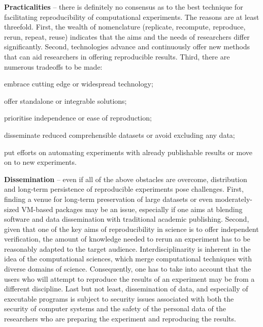 {\bf Practicalities} -- there is definitely no consensus as to the
  best technique for facilitating reproducibility of computational
  experiments. 
The reasons are at least threefold. 
First, the wealth of nomenclature (replicate, recompute, reproduce, 
  rerun, repeat, reuse) indicates that the aims and the needs of researchers
  differ significantly.
Second, technologies advance and continuously offer new methods that can
  aid researchers in offering reproducible results.
Third, there are numerous tradeoffs to be made: 
  \begin{inparaenum}[(i)]
  \item embrace cutting edge or widespread technology; 
  \item offer standalone or integrable solutions; 
  \item prioritise independence or ease of reproduction; 
  \item disseminate reduced comprehensible datasets or avoid excluding any data;
  \item put efforts on automating experiments with already publishable results
  or move on to new experiments.
  \end{inparaenum}
    
{\bf Dissemination} -- even if all of the above obstacles are overcome, 
  distribution and long-term persistence of reproducible experiments
  pose challenges.
First, finding a venue for long-term preservation of large datasets or even 
  moderately-sized VM-based packages may be an issue, especially
if one aims at blending software and data
  dissemination with traditional academic publishing.
Second, given that one of the key aims of reproducibility in science
  is to offer independent verification, the amount of knowledge 
  needed to rerun an experiment has to be reasonably adapted to the
  target audience.
Interdisciplinarity is inherent in the idea of the computational
sciences, which
  merge computational techniques with diverse domains of science.
Consequently, one has to take into account that the users who will attempt to
  reproduce the results of an experiment may be from a different discipline.
Last but not least, dissemination of data, and especially of executable
  programs is subject to security issues associated with both the security
  of computer systems and the safety of the personal data of the researchers who
  are preparing the experiment and reproducing the results.
